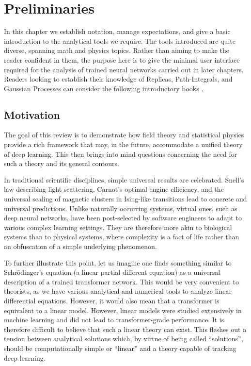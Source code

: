 \chapter{Preliminaries}
\label{c-Preliminaries} In this chapter we establish notation, manage expectations, and give a basic introduction to the analytical tools we require. The tools introduced are quite diverse, spanning math and physics topics. Rather than aiming to make the reader confident in them, the purpose here is to give the minimal user interface required for the analysis of trained neural networks carried out in later chapters. Readers looking to establish their knowledge of Replicas, Path-Integrals, and Gaussian Processes can consider the following introductory books   \cite{MezardBook,schulman1996,Rasmussen2005}.

\section{Motivation}
The goal of this review is to demonstrate how field theory and statistical physics provide a rich framework that may, in the future, accommodate a unified theory of deep learning. This then brings into mind questions concerning the need for such a theory and its general contours. 

In traditional scientific disciplines, simple universal results are celebrated. Snell's law describing light scattering, Carnot's optimal engine efficiency, and the universal scaling of magnetic clusters in Ising-like transitions lead to concrete and universal predictions. Unlike naturally occurring systems, virtual ones, such as deep neural networks, have been post-selected by software engineers to adapt to various complex learning settings. They are therefore more akin to biological systems than to physical systems, where complexity is a fact of life rather than an obfuscation of a simple underlying phenomenon.  

To further illustrate this point, let us imagine one finds something similar to Schrödinger's equation (a linear partial different equation) as a universal description of a trained transformer network. This would be very convenient to theorists, as we have various analytical and numerical tools to analyze linear differential equations. However, it would also mean that a transformer is equivalent to a linear model. However, linear models were studied extensively in machine learning and did not lead to transformer-grade performance. It is therefore difficult to believe that such a linear theory can exist. This fleshes out a tension between analytical solutions which, by virtue of being called ``solutions'', should be computationally simple or ``linear'' and a theory capable of tracking deep learning.

